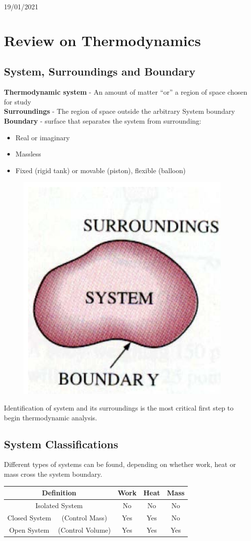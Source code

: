 \documentclass[class=report, crop=false, 12pt,a4paper]{standalone}
\begin{document}
\begin{center}
    19/01/2021
\end{center}
\section{Review on Thermodynamics}
\subsection{System, Surroundings and Boundary}
\textbf{Thermodynamic system} - An amount of matter “or” a region of space chosen for study \\
\textbf{Surroundings} - The region of space outside the arbitrary System boundary \\
\textbf{Boundary} - surface that separates the system from surrounding:
\begin{itemize}[noitemsep]
  \item Real or imaginary
  \item Massless
  \item Fixed (rigid tank) or movable (piston), flexible (balloon)
\end{itemize}
\begin{figure}[H]
  \centering
  \includegraphics[width = 0.4 \textwidth]{../img/diagram92.png}
  \caption{}
\end{figure}
Identification of system and its surroundings is the most critical first step to begin thermodynamic analysis.
\subsection{System Classifications}
Different types of systems can be found, depending on whether work, heat or mass cross the system boundary.
\begin{table}[H]
  \centering
  \begin{tabular}{|c|c|c|c|c|}
  \hline
  \multicolumn{2}{|c|}{\textbf{Definition}} & \textbf{Work} & \textbf{Heat} & \textbf{Mass} \\ \hline
  \multicolumn{2}{|c|}{Isolated System}     & No            & No            & No            \\ \hline
  Closed System      & (Control Mass)       & Yes           & Yes           & No            \\ \hline
  Open System        & (Control Volume)     & Yes           & Yes           & Yes           \\ \hline
  \end{tabular}
\end{table}
\end{document}
